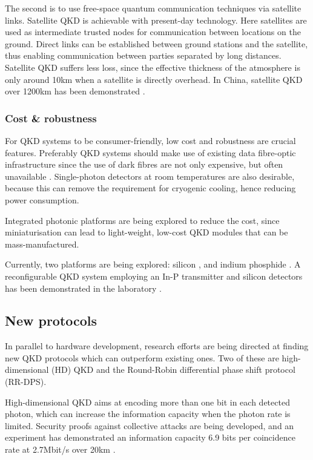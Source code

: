 The second is to use free-space quantum communication techniques via satellite links. Satellite QKD is achievable with  present-day technology. Here satellites are used as intermediate trusted nodes for communication between locations on the ground. Direct links can be established between ground stations and the satellite, thus enabling communication between parties separated by long distances. Satellite QKD suffers less loss, since the effective thickness of the atmosphere is only around 10km when a satellite is directly overhead. In China, satellite QKD over 1200km has been demonstrated \cite{bib:liao2017satellite}.

\subsubsection{Cost \& robustness}
 
For QKD systems to be consumer-friendly, low cost and robustness are crucial features. Preferably QKD systems should make use of existing data fibre-optic infrastructure since the use of dark fibres are not only expensive, but often unavailable \cite{bib:diamanti2016practical}. Single-photon detectors at room temperatures are also desirable,  because this can remove the requirement for cryogenic cooling, hence reducing power consumption.

Integrated photonic platforms are being explored to reduce the cost, since miniaturisation can lead to light-weight, low-cost QKD modules that can be mass-manufactured. 

Currently, two platforms are being explored: silicon \cite{bib:lim2014review}, and indium phosphide \cite{bib:smit2014introduction}. A reconfigurable QKD system employing an In-P transmitter and silicon detectors has been demonstrated in the laboratory \cite{bib:sibson2017chip}.

\subsection{New protocols}

In parallel to hardware development, research efforts are being directed at finding new QKD protocols which can outperform existing ones. Two of these are high-dimensional (HD) QKD and the Round-Robin differential phase shift protocol (RR-DPS).

High-dimensional QKD aims at encoding more than one bit in each detected photon, which can increase the information capacity when the photon rate is limited. Security proofs against collective attacks are being developed, and an experiment has demonstrated an information capacity 6.9 bits per coincidence rate at 2.7Mbit/s over 20km \cite{bib:zhong2015photon}.

